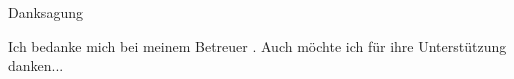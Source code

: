 \thispagestyle{empty}
\begin{center}
\large \lsstyle
Danksagung
\end{center}
\vspace{1.5cm}
Ich bedanke mich bei meinem Betreuer \betreuerI{}. Auch \betreuerII{} möchte ich für ihre Unterstützung danken...